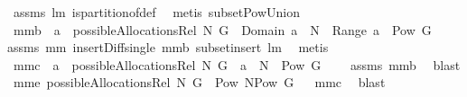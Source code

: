 \begin{isabellebody}
%
\isadelimproof
%
\endisadelimproof
%
\isatagproof
{}\isamarkupfalse%
\ assms\ lm{}{}\ is{\isacharunderscore}partition{\isacharunderscore}of{\isacharunderscore}def\ \isamarkupfalse%
\ {\isacharparenleft}metis\ subset{\isacharunderscore}Pow{\isacharunderscore}Union{\isacharparenright}%
\endisatagproof
{\isafoldproof}%
%
\isadelimproof
\isanewline
%
\endisadelimproof
{}\isamarkupfalse%
\ mm{}{}b{\isacharcolon}\ \ {\isachardoublequoteopen}a\ {\isasymin}\ possibleAllocationsRel\ N\ G{\isachardoublequoteclose}\ \ {\isachardoublequoteopen}Domain\ a\ {\isasymsubseteq}\ N\ {\isacharampersand}\ Range\ a\ {\isasymsubseteq}\ Pow\ G\ {\isacharminus}\ {\isacharbraceleft}{\isacharbraceleft}{\isacharbraceright}{\isacharbraceright}{\isachardoublequoteclose}%
\isadelimproof
\ %
\endisadelimproof
%
\isatagproof
{}\isamarkupfalse%
\isanewline
assms\ mm{}{}\ insert{\isacharunderscore}Diff{\isacharunderscore}single\ mm{}{}b\ subset{\isacharunderscore}insert\ lm{}{}\ \isamarkupfalse%
\ metis%
\endisatagproof
{\isafoldproof}%
%
\isadelimproof
%
\endisadelimproof
\isanewline
{}\isamarkupfalse%
\ mm{}{}c{\isacharcolon}\ \ {\isachardoublequoteopen}a\ {\isasymin}\ possibleAllocationsRel\ N\ G{\isachardoublequoteclose}\ \ {\isachardoublequoteopen}a\ {\isasymsubseteq}\ N\ {\isasymtimes}\ {\isacharparenleft}Pow\ G\ {\isacharminus}\ {\isacharbraceleft}{\isacharbraceleft}{\isacharbraceright}{\isacharbraceright}{\isacharparenright}{\isachardoublequoteclose}\ \isanewline
%
\isadelimproof
%
\endisadelimproof
%
\isatagproof
{}\isamarkupfalse%
\ assms\ mm{}{}b\ \isamarkupfalse%
\ blast%
\endisatagproof
{\isafoldproof}%
%
\isadelimproof
\isanewline
%
\endisadelimproof
{}\isamarkupfalse%
\ mm{}{}e{\isacharcolon}\ {\isachardoublequoteopen}possibleAllocationsRel\ N\ G\ {\isasymsubseteq}\ Pow\ {\isacharparenleft}N{\isasymtimes}{\isacharparenleft}Pow\ G{\isacharminus}{\isacharbraceleft}{\isacharbraceleft}{\isacharbraceright}{\isacharbraceright}{\isacharparenright}{\isacharparenright}{\isachardoublequoteclose}%
\isadelimproof
\ %
\endisadelimproof
%
\isatagproof
{}\isamarkupfalse%
\ mm{}{}c\ \isamarkupfalse%
\ blast%
\endisatagproof

\end{isabellebody}
